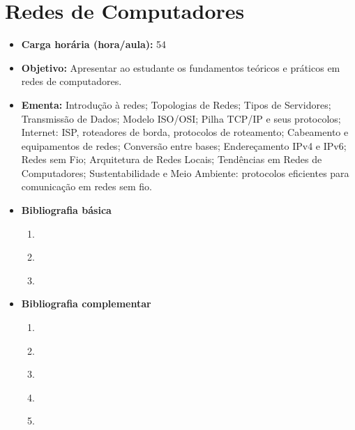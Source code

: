 \documentclass[
	10pt,				%
	openright,			%
	twoside,			%
	a4paper,			%
	english,			%
	french,				%
	brazil,				%
	sumario=tradicional
]{abntex2}
\begin{document}
\section*{Redes de Computadores}\label{3_redescomp}
\begin{itemize}
	\item \textbf{Carga horária (hora/aula):} 54
	\item \textbf{Objetivo:} Apresentar ao estudante os fundamentos teóricos e práticos em redes de computadores.
	\item \textbf{Ementa:} 
	Introdução à redes; 
	Topologias de Redes; 
	Tipos de Servidores; 
	Transmissão de Dados; 
	Modelo ISO/OSI; 
	Pilha TCP/IP e seus protocolos; 
	Internet: ISP,  roteadores de borda, protocolos de roteamento; 
	Cabeamento e equipamentos de redes; 
	Conversão entre bases; 
	Endereçamento IPv4 e IPv6; 
	Redes sem Fio; Arquitetura de Redes Locais; 
	Tendências em Redes de Computadores; 
	Sustentabilidade e Meio Ambiente: protocolos eficientes para comunicação em redes sem fio.
	\item \textbf{Bibliografia básica}
	\begin{enumerate}
		\item \cite{olsen2010}
		\item \cite{torres2014}
		\item \cite{tanenbaum2011redes}
	\end{enumerate}
	\item \textbf{Bibliografia complementar}
	\begin{enumerate}
		\item \cite{moraes2010}
		\item \cite{kurose2013}
		\item \cite{morimoto2010redes}
		\item \cite{anderson2011}
		\item \cite{Giavaroto2013}
	\end{enumerate}
\end{itemize}


\newpage
\end{document}
